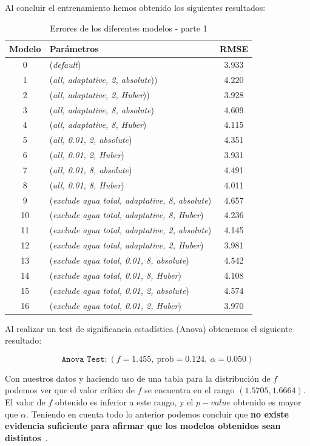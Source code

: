 \documentclass[12pt]{report} %
\begin{document}
 Al concluir el entrenamiento hemos obtenido los siguientes resultados:
\begin{table}[H]
\begin{center}
\begin{tabular}{ |c|l|c| }
    \hline
    Modelo & Parámetros & RMSE\\
    \hline
    \hline
    0 & (\textit{default})  & 3.933\\
    1 & (\textit{all, adaptative, 2, absolute}))  & 4.220\\
    2 & (\textit{all, adaptative, 2, Huber}))  & 3.928\\
    3 & (\textit{all, adaptative, 8, absolute})  & 4.609\\
    4 & (\textit{all, adaptative, 8, Huber})  & 4.115\\
    5 & (\textit{all, 0.01, 2, absolute})  & 4.351\\
    6 & (\textit{all, 0.01, 2, Huber})  & 3.931\\
    7 & (\textit{all, 0.01, 8, absolute})  & 4.491\\
    8 & (\textit{all, 0.01, 8, Huber})  & 4.011\\
    9 & (\textit{exclude agua total, adaptative, 8, absolute})  & 4.657\\
    10 & (\textit{exclude agua total, adaptative, 8, Huber})  & 4.236\\
    11 & (\textit{exclude agua total, adaptative, 2, absolute})  & 4.145\\
    12 & (\textit{exclude agua total, adaptative, 2, Huber})  & 3.981\\
    13 & (\textit{exclude agua total, 0.01, 8, absolute})  & 4.542\\
    14 & (\textit{exclude agua total, 0.01, 8, Huber})  & 4.108\\
    15 & (\textit{exclude agua total, 0.01, 2, absolute})  & 4.574\\
    16 & (\textit{exclude agua total, 0.01, 2, Huber})  & 3.970\\
    \hline
\end{tabular}
\caption{Errores de los diferentes modelos - parte 1}
\end{center}
\end{table}

    Al realizar un test de significancia estadística (Anova) obtenemos el siguiente resultado:

$$\texttt{Anova Test:}~(f=1.455,~\text{prob}=0.124,~\alpha=0.050)$$

Con nuestros datos y haciendo uso de una tabla para la distribución de $f$~\cite{f-distro} podemos ver que el valor crítico de $f$ se encuentra en el rango $(1.5705, 1.6664)$. El valor de $f$ obtenido es inferior a este rango, y el $p-value$ obtenido es mayor que $\alpha$. Teniendo en cuenta todo lo anterior podemos concluir que \textbf{no existe evidencia suficiente para afirmar que los modelos obtenidos sean distintos}~\cite{anova-RM}.
\end{document}
